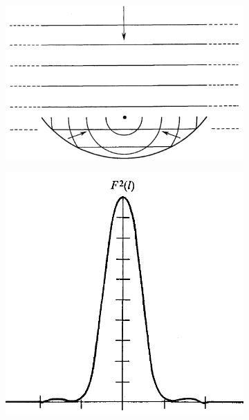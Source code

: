 \documentclass[a4paper,10pt]{report}
\begin{document}
\begin{figure}[ht]
 \begin{mdframed}
  \centering
  \begin{subfigure}[b]{0.3\textwidth}
   \includegraphics[width=\textwidth]{images/diffraction_pattern.png}
   \caption{}
  \end{subfigure}
  \begin{subfigure}[b]{0.3\textwidth}
   \includegraphics[width=\textwidth]{images/field_strength_in_the_focal_plane.png}
   \caption{}
  \end{subfigure}

\end{mdframed}
\end{figure}
\end{document}
